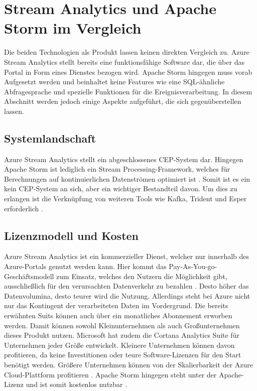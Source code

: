\section{Stream Analytics und Apache Storm im Vergleich}
Die beiden Technologien als Produkt lassen keinen direkten Vergleich zu. Azure Stream Analytics stellt bereits eine funktionsfähige Software dar, die über das Portal in Form eines Dienstes bezogen wird. Apache Storm hingegen muss vorab Aufgesetzt werden und beinhaltet keine Features wie eine SQL-ähnliche Abfragesprache und spezielle Funktionen für die Ereignisverarbeitung. In diesem Abschnitt werden jedoch einige Aspekte aufgeführt, die sich gegenüberstellen lassen. 


\subsection{Systemlandschaft} 
Azure Stream Analytics stellt ein abgeschlossenes CEP-System dar. Hingegen Apache Storm ist lediglich ein Stream Processing-Framework, welches für Berechnungen auf kontinuierlichen Datenströmen optimiert ist \cite{Azure.2017}. Somit ist es ein kein CEP-System an sich, aber ein wichtiger Bestandteil davon. Um dies zu erlangen ist die Verknüpfung von weiteren Tools wie Kafka, Trident und Esper \cite{esper.2016} erforderlich \cite{apache.2017}.

\subsection{Lizenzmodell und Kosten}
Azure Stream Analytics ist ein kommerzieller Dienst, welcher nur innerhalb des Azure-Portals genutzt werden kann. Hier kommt das Pay-As-You-go-Geschäftsmodell zum Einsatz, welches den Nutzern die Möglichkeit gibt, ausschließlich für den verursachten Datenverkehr zu bezahlen \cite{Pricing.2017}. Desto höher das Datenvolumina, desto teurer wird die Nutzung. Allerdings steht bei Azure nicht nur das Kontingent der verarbeiteten Daten im Vordergrund. Die bereits erwähnten Suits können auch über ein monatliches Abonnement erworben werden. Damit können sowohl Kleinunternehmen als auch Großunternehmen dieses Produkt nutzen. Microsoft hat zudem die Cortana Analytics Suite für Unternehmen jeder Größe entwickelt. Kleinere Unternehmen können davon profitieren, da keine Investitionen oder teure Software-Lizenzen für den Start benötigt werden. Größere Unternehmen können von der Skalierbarkeit der Azure Cloud-Plattform profitieren \cite{Azure.2017}. Apache Storm hingegen steht unter der Apache-Lizenz und ist somit kostenlos nutzbar \cite{lizenz.2004}.


